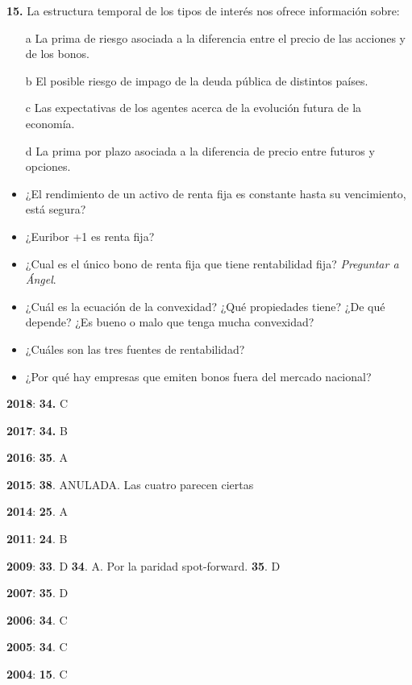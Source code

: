 \documentclass{nuevotema}
\begin{document}
\textbf{15.} La estructura temporal de los tipos de interés nos ofrece información sobre:
\begin{enumerate}
	\item[a] La prima de riesgo asociada a la diferencia entre el precio de las acciones y de los bonos.
	\item[b] El posible riesgo de impago de la deuda pública de distintos países.
	\item[c] Las expectativas de los agentes acerca de la evolución futura de la economía.
	\item[d] La prima por plazo asociada a la diferencia de precio entre futuros y opciones.
\end{enumerate}


\begin{itemize}
    \item ¿El rendimiento de un activo de renta fija es constante hasta su vencimiento, está segura?
    \item ¿Euribor +1 es renta fija?
    \item ¿Cual es el único bono de renta fija que tiene rentabilidad fija? \textit{Preguntar a Ángel}.
    \item ¿Cuál es la ecuación de la convexidad? ¿Qué propiedades tiene? ¿De qué depende? ¿Es bueno o malo que tenga mucha convexidad?
    \item ¿Cuáles son las tres fuentes de rentabilidad?
    \item ¿Por qué hay empresas que emiten bonos fuera del mercado nacional?
\end{itemize}

\notas

\textbf{2018}: \textbf{34.} C

\textbf{2017}: \textbf{34.} B

\textbf{2016}: \textbf{35}. A 

\textbf{2015}: \textbf{38}. ANULADA. Las cuatro parecen ciertas

\textbf{2014}: \textbf{25}. A

\textbf{2011}: \textbf{24}. B

\textbf{2009}: \textbf{33}. D \textbf{34}. A. Por la paridad spot-forward. \textbf{35}. D

\textbf{2007}: \textbf{35}. D

\textbf{2006}: \textbf{34}. C

\textbf{2005}: \textbf{34}. C

\textbf{2004}:  \textbf{15}. C
\end{document}
